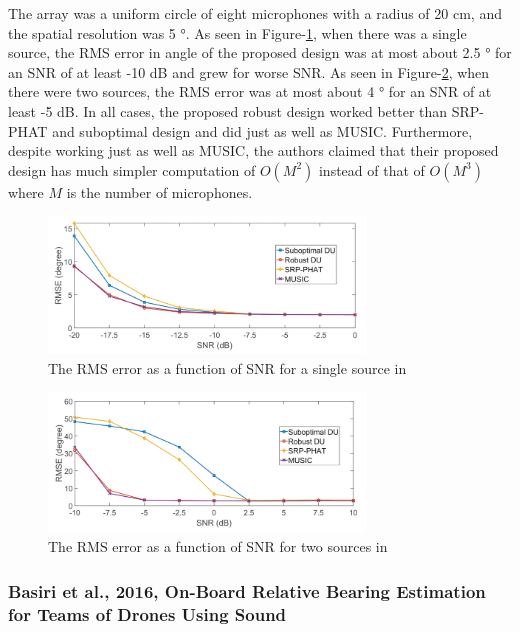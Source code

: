 \documentclass[notitlepage]{report}
\begin{document}
The array was a uniform circle of eight microphones with a radius of 20 \si{cm}, and the spatial resolution was 5 \si{\degree}. As seen in Figure-\ref{fig:salvati_2019_RMSE_SNR}, when there was a single source, the RMS error in angle of the proposed design was at most about 2.5 \si{\degree} for an SNR of at least -10 \si{dB} and grew for worse SNR. As seen in Figure-\ref{fig:salvati_2019_RMSE_SNR_two}, when there were two sources, the RMS error was at most about 4 \si{\degree} for an SNR of at least -5 \si{dB}. In all cases, the proposed robust design worked better than SRP-PHAT and suboptimal design and did just as well as MUSIC. Furthermore, despite working just as well as MUSIC, the authors claimed that their proposed design has much simpler computation of $O(M^2)$ instead of that of $O(M^3)$ where $M$ is the number of microphones.

\begin{figure}[H]
\includegraphics[width=0.75\textwidth]{./salvati_2019/RMSE_SNR.png}
\centering
\caption{The RMS error as a function of SNR for a single source in \cite{salvati_power_2019}}
\label{fig:salvati_2019_RMSE_SNR}
\centering
\end{figure}

\begin{figure}[H]
\includegraphics[width=0.75\textwidth]{./salvati_2019/RMSE_SNR_two.png}
\centering
\caption{The RMS error as a function of SNR for two sources in \cite{salvati_power_2019}}
\label{fig:salvati_2019_RMSE_SNR_two}
\centering
\end{figure}

\subsubsection{Basiri et al., 2016, On-Board Relative Bearing Estimation for Teams of Drones Using Sound}
\end{document}
